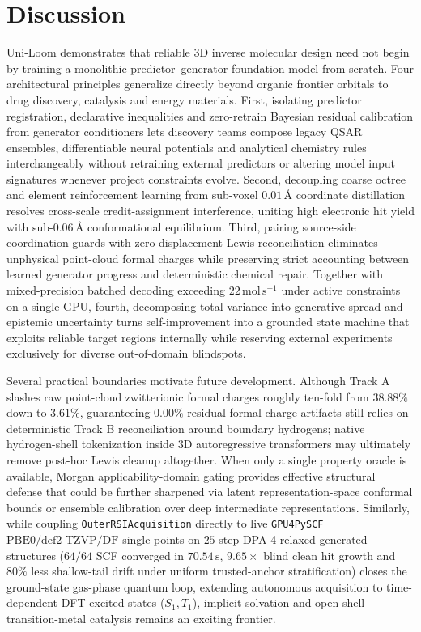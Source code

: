 \documentclass[11pt,a4paper]{article}
\begin{document}
\section*{Discussion}

Uni-Loom demonstrates that reliable 3D inverse molecular design need not begin by training a monolithic predictor--generator foundation model from scratch. Four architectural principles generalize directly beyond organic frontier orbitals to drug discovery, catalysis and energy materials. First, isolating predictor registration, declarative inequalities and zero-retrain Bayesian residual calibration from generator conditioners lets discovery teams compose legacy QSAR ensembles, differentiable neural potentials and analytical chemistry rules interchangeably without retraining external predictors or altering model input signatures whenever project constraints evolve. Second, decoupling coarse octree and element reinforcement learning from sub-voxel $0.01\,\text{\AA}$ coordinate distillation resolves cross-scale credit-assignment interference, uniting high electronic hit yield with sub-$0.06\,\text{\AA}$ conformational equilibrium. Third, pairing source-side coordination guards with zero-displacement Lewis reconciliation eliminates unphysical point-cloud formal charges while preserving strict accounting between learned generator progress and deterministic chemical repair. Together with mixed-precision batched decoding exceeding $22\,\text{mol}\,\text{s}^{-1}$ under active constraints on a single GPU, fourth, decomposing total variance into generative spread and epistemic uncertainty turns self-improvement into a grounded state machine that exploits reliable target regions internally while reserving external experiments exclusively for diverse out-of-domain blindspots.

Several practical boundaries motivate future development. Although Track A slashes raw point-cloud zwitterionic formal charges roughly ten-fold from $38.88\%$ down to $3.61\%$, guaranteeing $0.00\%$ residual formal-charge artifacts still relies on deterministic Track B reconciliation around boundary hydrogens; native hydrogen-shell tokenization inside 3D autoregressive transformers may ultimately remove post-hoc Lewis cleanup altogether. When only a single property oracle is available, Morgan applicability-domain gating provides effective structural defense that could be further sharpened via latent representation-space conformal bounds or ensemble calibration over deep intermediate representations. Similarly, while coupling \texttt{OuterRSIAcquisition} directly to live \texttt{GPU4PySCF}\cite{sun2020pyscf,li2024gpu4pyscf} $\text{PBE0/def2-TZVP/DF}$ single points on $25$-step DPA-4-relaxed generated structures ($64/64$ SCF converged in $70.54\,\text{s}$, $9.65\times$ blind clean hit growth and $80\%$ less shallow-tail drift under uniform trusted-anchor stratification) closes the ground-state gas-phase quantum loop, extending autonomous acquisition to time-dependent DFT excited states ($S_1, T_1$), implicit solvation and open-shell transition-metal catalysis remains an exciting frontier.
\end{document}
